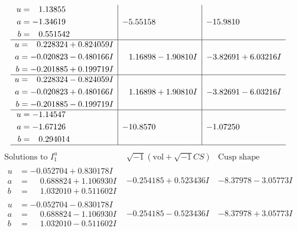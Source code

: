 \documentclass[1p]{elsarticle_modified}
\theoremstyle{definition}
\newcommand{\I}{\sqrt{-1}}
\begin{document}
$$\begin{array}{c|c|c}
\begin{aligned}
u &= \phantom{-}1.13855\phantom{ +0.000000I} \\
a &= -1.34619\phantom{ +0.000000I} \\
b &= \phantom{-}0.551542\phantom{ +0.000000I}\end{aligned}
 & -5.55158\phantom{ +0.000000I} & -15.9810\phantom{ +0.000000I} \\ \hline\begin{aligned}
u &= \phantom{-}0.228324 + 0.824059 I \\
a &= -0.020823 - 0.480166 I \\
b &= -0.201885 + 0.199719 I\end{aligned}
 & \phantom{-}1.16898 - 1.90810 I & -3.82691 + 6.03216 I \\ \hline\begin{aligned}
u &= \phantom{-}0.228324 - 0.824059 I \\
a &= -0.020823 + 0.480166 I \\
b &= -0.201885 - 0.199719 I\end{aligned}
 & \phantom{-}1.16898 + 1.90810 I & -3.82691 - 6.03216 I \\ \hline\begin{aligned}
u &= -1.14547\phantom{ +0.000000I} \\
a &= -1.67126\phantom{ +0.000000I} \\
b &= \phantom{-}0.294014\phantom{ +0.000000I}\end{aligned}
 & -10.8570\phantom{ +0.000000I} & -1.07250\phantom{ +0.000000I}\\
 \hline 
 \end{array}$$\newpage$$\begin{array}{c|c|c}  
\text{Solutions to }I^u_{1}& \I (\text{vol} + \sqrt{-1}CS) & \text{Cusp shape}\\
 \hline 
\begin{aligned}
u &= -0.052704 + 0.830178 I \\
a &= \phantom{-}0.688824 + 1.106930 I \\
b &= \phantom{-}1.032010 + 0.511602 I\end{aligned}
 & -0.254185 + 0.523436 I & -8.37978 - 3.05773 I \\ \hline\begin{aligned}
u &= -0.052704 - 0.830178 I \\
a &= \phantom{-}0.688824 - 1.106930 I \\
b &= \phantom{-}1.032010 - 0.511602 I\end{aligned}
 & -0.254185 - 0.523436 I & -8.37978 + 3.05773 I \\ \hline\begin{aligned}

\end{aligned}
\end{array}$$
\end{document}
